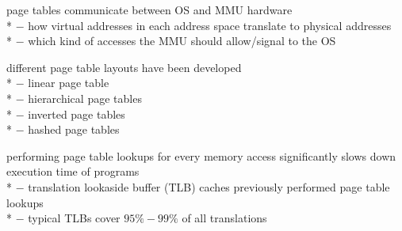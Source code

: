 \begin{summary}
  \begin{items}
    \item page tables communicate between OS and MMU hardware  \\*
      $ - $ how virtual addresses in each address space translate to physical addresses \\*
      $ - $ which kind of accesses the MMU should allow/signal to the OS
    \item different page table layouts have been developed  \\*
      $ - $ linear page table \\*
      $ - $ hierarchical page tables \\*
      $ - $ inverted page tables \\*
      $ - $ hashed page tables
    \item performing page table lookups for every memory access significantly slows down execution time of programs \\*
    $ - $ translation lookaside buffer (TLB) caches previously performed page table lookups \\*
    $ - $ typical TLBs cover $ 95\%-99\% $ of all translations
  \end{items}
\end{summary}